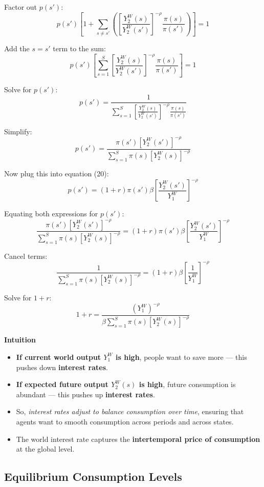 \documentclass[12pt]{article}
\begin{document}
Factor out \( p(s') \):
\[
p(s') \left[ 1 + \sum_{s \neq s'} \left( \left[ \frac{Y_2^W(s)}{Y_2^W(s')} \right]^{-\rho} \frac{\pi(s)}{\pi(s')} \right) \right] = 1
\]

Add the \( s = s' \) term to the sum:
\[
p(s') \left[ \sum_{s=1}^S \left[ \frac{Y_2^W(s)}{Y_2^W(s')} \right]^{-\rho} \frac{\pi(s)}{\pi(s')} \right] = 1
\]

Solve for \( p(s') \):
\[
p(s') = \frac{1}{\sum_{s=1}^S \left[ \frac{Y_2^W(s)}{Y_2^W(s')} \right]^{-\rho} \frac{\pi(s)}{\pi(s')}}
\]

Simplify:
\[
p(s') = \frac{\pi(s') \left[ Y_2^W(s') \right]^{-\rho}}{\sum_{s=1}^S \pi(s) \left[ Y_2^W(s) \right]^{-\rho}}
\]

Now plug this into equation (20):
\[
p(s') = (1 + r) \pi(s') \beta \left[ \frac{Y_2^W(s')}{Y_1^W} \right]^{-\rho}
\]

Equating both expressions for \( p(s') \):
\[
\frac{\pi(s') \left[ Y_2^W(s') \right]^{-\rho}}{\sum_{s=1}^S \pi(s) \left[ Y_2^W(s) \right]^{-\rho}} = (1 + r) \pi(s') \beta \left[ \frac{Y_2^W(s')}{Y_1^W} \right]^{-\rho}
\]

Cancel terms:
\[
\frac{1}{\sum_{s=1}^S \pi(s) \left[ Y_2^W(s) \right]^{-\rho}} = (1 + r) \beta \left[ \frac{1}{Y_1^W} \right]^{-\rho}
\]

Solve for \( 1 + r \):
\[
1 + r = \frac{(Y_1^W)^{-\rho}}{\beta \sum_{s=1}^S \pi(s) \left[ Y_2^W(s) \right]^{-\rho}}
\]

\textbf{Intuition} 

\begin{itemize}
    \item \textbf{If current world output \( Y_1^W \) is high}, people want to save more — this pushes down \textbf{interest rates}.
    \item \textbf{If expected future output \( Y_2^W(s) \) is high}, future consumption is abundant — this pushes up \textbf{interest rates}.
    \item So, \textit{interest rates adjust to balance consumption over time}, ensuring that agents want to smooth consumption across periods and across states.
    \item The world interest rate captures the \textbf{intertemporal price of consumption} at the global level.
\end{itemize}

\subsection*{Equilibrium Consumption Levels}
\end{document}
